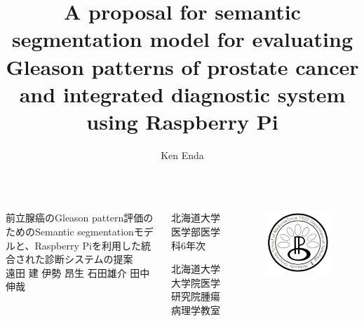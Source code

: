 \documentclass[final,dvipdfmx]{beamer}
\title{A proposal for semantic segmentation model for evaluating Gleason patterns of prostate cancer and integrated diagnostic system using Raspberry Pi}
\author{Ken Enda}
\institute{Department of Cancer Pathology Faculty of Medicine, HOKKAIDO UNIVERSITY }
\begin{document}
\nocite{*}

\begin{columns}[T]
  \begin{minipage}[]{0.75\columnwidth}
    \vspace{5mm}
    \huge 前立腺癌のGleason pattern評価のためのSemantic segmentationモデルと、Raspberry Piを利用した統合された診断システムの提案
    \\[5mm]
    \large 遠田 建\cite{student} \hspace{5mm} 伊勢 昂生\cite{student} \hspace{5mm} 石田雄介\cite{teacher} \hspace{5mm} 田中 伸哉\cite{teacher}
    {\small
      \begin{thebibliography}{99}
        \beamertemplatetextbibitems
        \setlength{\itemsep}{-.5zw}
        \begin{minipage}[]{0.25\columnwidth}
           北海道大学医学部医学科6年次
        \end{minipage}
        \begin{minipage}[]{0.40\columnwidth}
           北海道大学大学院医学研究院腫瘍病理学教室
        \end{minipage}
      \end{thebibliography}
    }

  \end{minipage}

  \begin{minipage}[]{0.08\columnwidth}
    \begin{figure}\centering
      \includegraphics[width=\columnwidth]{assets/logo_patho2.png}
    \end{figure}
  \end{minipage}


\end{columns}
\end{document}
